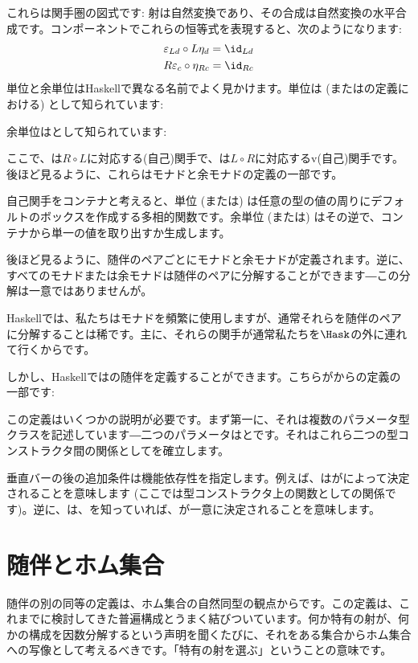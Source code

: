\noindent
これらは関手圏の図式です: 射は自然変換であり、その合成は自然変換の水平合成です。コンポーネントでこれらの恒等式を表現すると、次のようになります: 
\begin{gather*}
  \varepsilon_{L d} \circ L \eta_d = \id_{L d} \\
  R \varepsilon_{c} \circ \eta_{R c} = \id_{R c}
\end{gather*}
単位と余単位はHaskellで異なる名前でよく見かけます。単位は (またはの定義における) として知られています: 

余単位はとして知られています: 

ここで、は$R \circ L$に対応する(自己)関手で、は$L \circ R$に対応するv(自己)関手です。後ほど見るように、これらはモナドと余モナドの定義の一部です。

自己関手をコンテナと考えると、単位 (または) は任意の型の値の周りにデフォルトのボックスを作成する多相的関数です。余単位 (または) はその逆で、コンテナから単一の値を取り出すか生成します。

後ほど見るように、随伴のペアごとにモナドと余モナドが定義されます。逆に、すべてのモナドまたは余モナドは随伴のペアに分解することができます―この分解は一意ではありませんが。

Haskellでは、私たちはモナドを頻繁に使用しますが、通常それらを随伴のペアに分解することは稀です。主に、それらの関手が通常私たちを$\Hask$の外に連れて行くからです。

しかし、Haskellではの随伴を定義することができます。こちらがからの定義の一部です: 

この定義はいくつかの説明が必要です。まず第一に、それは複数のパラメータ型クラスを記述しています―二つのパラメータはとです。それはこれら二つの型コンストラクタ間の関係としてを確立します。

垂直バーの後の追加条件は機能依存性を指定します。例えば、はがによって決定されることを意味します (ここでは型コンストラクタ上の関数としての関係です)。逆に、は、を知っていれば、が一意に決定されることを意味します。

\section{随伴とホム集合}

随伴の別の同等の定義は、ホム集合の自然同型の観点からです。この定義は、これまでに検討してきた普遍構成とうまく結びついています。何か特有の射が、何かの構成を因数分解するという声明を聞くたびに、それをある集合からホム集合への写像として考えるべきです。「特有の射を選ぶ」ということの意味です。

